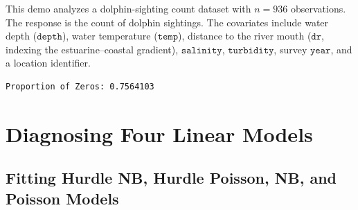 \documentclass[
  english,
  letterpaper,
  DIV=11,
  numbers=noendperiod]{scrartcl}
\newenvironment{Shaded}{\begin{snugshade}}{\end{snugshade}}
\newcommand{\AttributeTok}[1]{\textcolor[rgb]{0.40,0.45,0.13}{#1}}
\newcommand{\CommentTok}[1]{\textcolor[rgb]{0.37,0.37,0.37}{#1}}
\newcommand{\ConstantTok}[1]{\textcolor[rgb]{0.56,0.35,0.01}{#1}}
\newcommand{\ControlFlowTok}[1]{\textcolor[rgb]{0.00,0.23,0.31}{\textbf{#1}}}
\newcommand{\DecValTok}[1]{\textcolor[rgb]{0.68,0.00,0.00}{#1}}
\newcommand{\FunctionTok}[1]{\textcolor[rgb]{0.28,0.35,0.67}{#1}}
\newcommand{\NormalTok}[1]{\textcolor[rgb]{0.00,0.23,0.31}{#1}}
\newcommand{\OtherTok}[1]{\textcolor[rgb]{0.00,0.23,0.31}{#1}}
\newcommand{\SpecialCharTok}[1]{\textcolor[rgb]{0.37,0.37,0.37}{#1}}
\newcommand{\StringTok}[1]{\textcolor[rgb]{0.13,0.47,0.30}{#1}}
\begin{document}
This demo analyzes a dolphin-sighting count dataset with \(n=936\)
observations. The response is the count of dolphin sightings. The
covariates include water depth (\(\texttt{depth}\)), water temperature
(\(\texttt{temp}\)), distance to the river mouth (\(\texttt{dr}\),
indexing the estuarine--coastal gradient), \(\texttt{salinity}\),
\(\texttt{turbidity}\), survey \(\texttt{year}\), and a location
identifier.

\begin{Shaded}
\end{Shaded}

\begin{verbatim}
Proportion of Zeros: 0.7564103
\end{verbatim}

\section{Diagnosing Four Linear
Models}\label{diagnosing-four-linear-models}

\subsection{Fitting Hurdle NB, Hurdle Poisson, NB, and Poisson
Models}\label{fitting-hurdle-nb-hurdle-poisson-nb-and-poisson-models}
\end{document}
